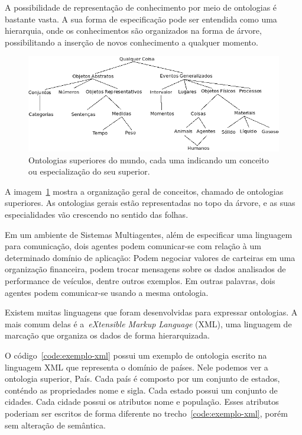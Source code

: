 A possibilidade de representação de conhecimento por meio de ontologias é bastante vasta. A sua forma de especificação pode ser entendida como uma hierarquia, onde os conhecimentos são organizados na forma de árvore, possibilitando a inserção de novos conhecimento a qualquer momento.

\begin{figure}
	\centering
	\includegraphics[scale=0.65]{images/arvore-ontologia.png}
	\caption{Ontologias superiores do mundo, cada uma indicando um conceito ou especialização do seu superior.}
	\label{fig:arvore-ontologia}
\end{figure}

A imagem~\ref{fig:arvore-ontologia} mostra a organização geral de conceitos, chamado de ontologias superiores. As ontologias gerais estão representadas no topo da árvore, e as suas especialidades vão crescendo no sentido das folhas.

Em um ambiente de Sistemas Multiagentes, além de especificar uma linguagem para comunicação, dois agentes podem comunicar-se com relação à um determinado domínio de aplicação: Podem negociar valores de carteiras em uma organização financeira, podem trocar mensagens sobre os dados analisados de performance de veículos, dentre outros exemplos. Em outras palavras, dois agentes podem comunicar-se usando a mesma ontologia.

Existem muitas linguagens que foram desenvolvidas para expressar ontologias. A mais comum delas é a~\emph{eXtensible Markup Language} (XML), uma linguagem de marcação que organiza os dados de forma hierarquizada.

O código~\ref{code:exemplo-xml} possui um exemplo de ontologia escrito na linguagem XML que representa o domínio de países. Nele podemos ver a ontologia superior, País. Cada país é composto por um conjunto de estados, conténdo as propriedades nome e sigla. Cada estado possui um conjunto de cidades. Cada cidade possui os atributos nome e população. Esses atributos poderiam ser escritos de forma diferente no trecho~\ref{code:exemplo-xml}, porém sem alteração de semântica.


